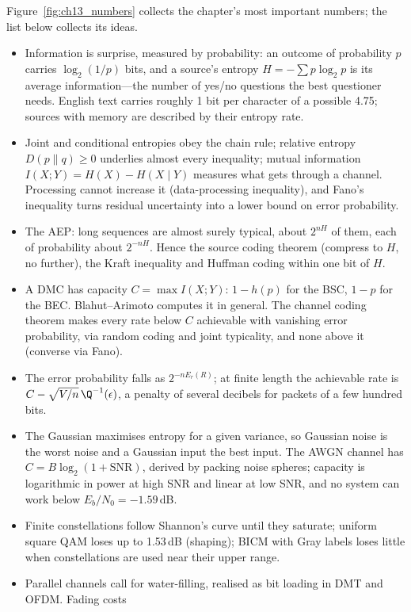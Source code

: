 Figure~\ref{fig:ch13_numbers} collects the chapter's most important numbers; the list below
collects its ideas.

\begin{itemize}
\item Information is surprise, measured by probability: an outcome of probability $p$ carries
$\log_2(1/p)$ bits, and a source's entropy $H=-\sum p\log_2p$ is its average information---the
number of yes/no questions the best questioner needs. English text carries roughly 1 bit per
character of a possible 4.75; sources with memory are described by their entropy rate.
\item Joint and conditional entropies obey the chain rule; relative entropy $D(p\|q)\ge0$ underlies
almost every inequality; mutual information $I(X;Y)=H(X)-H(X\mid Y)$ measures what gets through a
channel. Processing cannot increase it (data-processing inequality), and Fano's inequality turns
residual uncertainty into a lower bound on error probability.
\item The AEP: long sequences are almost surely typical, about $2^{nH}$ of them, each of probability
about $2^{-nH}$. Hence the source coding theorem (compress to $H$, no further), the Kraft inequality
and Huffman coding within one bit of $H$.
\item A DMC has capacity $C=\max I(X;Y)$: $1-h(p)$ for the BSC, $1-p$ for the BEC. Blahut--Arimoto
computes it in general. The channel coding theorem makes every rate below $C$ achievable with
vanishing error probability, via random coding and joint typicality, and none above it (converse
via Fano).
\item The error probability falls as $2^{-nE_r(R)}$; at finite length the achievable rate is
$C-\sqrt{V/n}\,\Q^{-1}(\epsilon)$, a penalty of several decibels for packets of a few hundred bits.
\item The Gaussian maximises entropy for a given variance, so Gaussian noise is the worst noise and a
Gaussian input the best input. The AWGN channel has $C=B\log_2(1+\mathrm{SNR})$, derived by packing
noise spheres; capacity is logarithmic in power at high SNR and linear at low SNR, and no system can
work below $E_b/N_0=-1.59$\,dB.
\item Finite constellations follow Shannon's curve until they saturate; uniform square QAM loses up to
1.53\,dB (shaping); BICM with Gray labels loses little when constellations are used near their
upper range.
\item Parallel channels call for water-filling, realised as bit loading in DMT and OFDM. Fading costs

\end{itemize}
